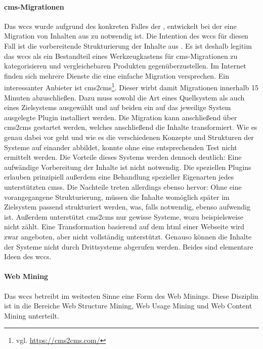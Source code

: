         \paragraph{\gls{cms}-Migrationen}
        Das \gls{wccs} wurde aufgrund des konkreten Falles der {\fernUni},
        entwickelt bei der eine Migration von Inhalten aus {\wordpress} zu {\imperia} notwendig ist.
        Die Intention des \gls{wccs} für diesen Fall ist die vorbereitende Strukturierung der
        Inhalte aus {\wordpress}.
        Es ist deshalb legitim das \gls{wccs} als ein Bestandteil eines Werkzeugkastens
        für \gls{cms}-Migrationen zu kategorisieren und vergleichebaren Produkten gegenüberzustellen.
        Im Internet finden sich mehrere Dienste die eine einfache Migration versprechen.
        Ein interessanter Anbieter ist cms2cms\footnote{vgl. \url{https://cms2cms.com/}}.
        Dieser wirbt damit Migrationen innerhalb 15 Minuten abzuschließen.
        Dazu muss sowohl die Art eines Quellsystem als auch eines Zielsystems ausgewählt
        und auf beiden ein auf das jeweilige System ausgelegte Plugin installiert werden.
        Die Migration kann anschließend über cms2cms gestartet werden,
        welches anschließend die Inhalte transformiert.
        Wie es genau dabei vor geht und wie es die verschiedenen Konzepte und Strukturen
        der Systeme auf einander abbildet, konnte ohne eine entsprechenden Test nicht ermittelt werden.
        Die Vorteile dieses Systems werden dennoch deutlich:
        Eine aufwändige Vorbereitung der Inhalte ist nicht notwendig.
        Die speziellen Plugins erlauben prinzipiell außerdem eine Behandlung spezieller
        Eigenarten jedes unterstützten \glspl{cms}.
        Die Nachteile treten allerdings ebenso hervor: Ohne eine vorangegangene Strukturierung,
        müssen die Inhalte womöglich später im Zielsystem passend strukturiert werden,
        was, falls notwendig, ebenso aufwendig ist.
        Außerdem unterstützt cms2cms nur gewisse Systeme,
        wozu {\imperia} beispielsweise nicht zählt.
        Eine Transformation basierend auf dem \gls{html} einer Webseite wird zwar angeboten,
        aber nicht vollständig unterstützt.
        Genauso können die Inhalte der Systeme nicht durch Drittsysteme abgerufen werden.
        Beides sind elementare Ideen des \gls{wccs}.

        \paragraph{Web Mining}
        Das \gls{wccs} betreibt im weitesten Sinne eine Form des Web Minings.
        Diese Disziplin ist in die Bereiche Web Structure Mining,
        Web Usage Mining und Web Content Mining unterteilt\cite{markov:webMining}.

